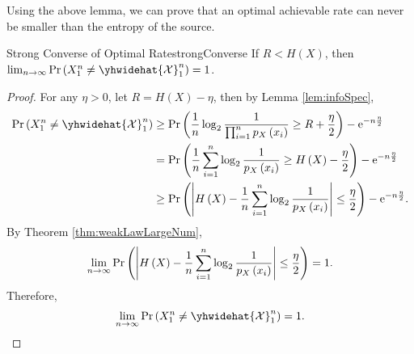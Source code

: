 \documentclass[math]{amznotes}
\theoremstyle{remark}
\newcommand{\e}{\mathrm{e}}
\begin{document}
Using the above lemma, we can prove that an optimal achievable rate can never be smaller than the entropy of the source.
\begin{thmbox}{Strong Converse of Optimal Rate}{strongConverse}
    If $R < H\left(X\right)$, then $\lim_{n \to \infty}\Pr\left(X_1^n \neq \yhwidehat{\mathcal{X}}_1^n\right) = 1$.
    \tcblower
    \begin{proof}
        For any $\eta > 0$, let $R = H\left(X\right) - \eta$, then by Lemma \ref{lem:infoSpec}, 
        \begin{align*}
            \Pr\left(X_1^n \neq \yhwidehat{\mathcal{X}}_1^n\right) & \geq \Pr\left(\frac{1}{n}\log_2\frac{1}{\prod_{i = 1}^np_X\left(x_i\right)} \geq R + \frac{\eta}{2}\right) - \e^{-n\frac{\eta}{2}} \\
            & = \Pr\left(\frac{1}{n}\sum_{i = 1}^{n}\log_2\frac{1}{p_X\left(x_i\right)} \geq H\left(X\right) - \frac{\eta}{2}\right) - \e^{-n\frac{\eta}{2}} \\
            & \geq \Pr\left(\abs{H\left(X\right) - \frac{1}{n}\sum_{i = 1}^{n}\log_2\frac{1}{p_X\left(x_i\right)}} \leq \frac{\eta}{2}\right) - \e^{-n\frac{\eta}{2}}.
        \end{align*}
        By Theorem \ref{thm:weakLawLargeNum}, 
        \begin{align*}
            \lim_{n \to \infty}\Pr\left({\left\lvert {H\left(X\right) - \frac{1}{n}\sum_{i = 1}^{n}\log_2\frac{1}{p_X\left(x_i\right)}} \right\rvert} \leq \frac{\eta}{2}\right) = 1.
        \end{align*}
        Therefore, 
        \begin{equation*}
            \lim_{n \to \infty}\Pr\left(X_1^n \neq \yhwidehat{\mathcal{X}}_1^n\right) = 1.
        \end{equation*}
    \end{proof}
\end{thmbox}
\end{document}
